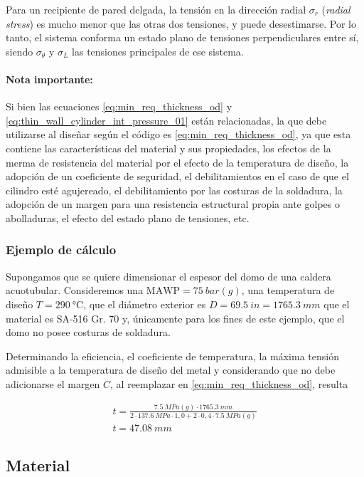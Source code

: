 Para un recipiente de pared delgada, la tensión en la dirección radial $\sigma_{r}$ (\textit{radial stress}) es mucho menor que las otras dos tensiones, y puede desestimarse. Por lo tanto, el sistema conforma un estado plano de tensiones perpendiculares entre sí, siendo $\sigma_{\theta}$ y $\sigma_L$ las tensiones principales de ese sistema.

\paragraph{Nota importante:} Si bien las ecuaciones \ref{eq:min_req_thickness_od} y \ref{eq:thin_wall_cylinder_int_pressure_01} están relacionadas, la que debe utilizarse al diseñar según el código es \ref{eq:min_req_thickness_od}, ya que esta contiene las características del material y sus propiedades, los efectos de la merma de resistencia del material por el efecto de la temperatura de diseño, la adopción de un coeficiente de seguridad, el debilitamientos en el caso de que el cilindro esté agujereado, el debilitamiento por las costuras de la soldadura, la adopción de un margen para una resistencia estructural propia ante golpes o abolladuras, el efecto del estado plano de tensiones, etc. 

\subsubsection{Ejemplo de cálculo}

Supongamos que se quiere dimensionar el espesor del domo de una caldera acuotubular. Consideremos una $\text{MAWP}=\SI{75}{bar(g)}$, una temperatura de diseño $T=\SI{290}{\celsius}$, que el diámetro exterior es $D=\SI{69,5}{in}=\SI{1765.3}{mm}$ que el material es SA-516 Gr. 70 y, únicamente para los fines de este ejemplo, que el domo no posee costuras de soldadura.

Determinando la eficiencia, el coeficiente de temperatura, la máxima tensión admisible a la temperatura de diseño del metal y considerando que no debe adicionarse el margen $C$, al reemplazar en \ref{eq:min_req_thickness_od}, resulta

\begin{gather*}
     t=\frac{\SI{7,5}{MPa(g)}\cdot\SI{1765,3}{mm}}{2\cdot\SI{137,6}{MPa}\cdot 1,0+2\cdot 0,4\cdot \SI{7,5}{MPa(g)}}\\
     \boxed{t=\SI{47,08}{mm}}
\end{gather*}

\subsection{Material}

